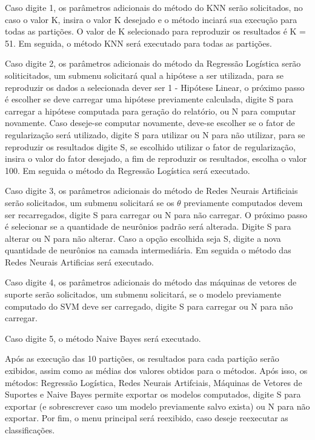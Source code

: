 Caso digite 1, os parâmetros adicionais do método do KNN serão solicitados, no caso o valor K, insira o valor K desejado e o método inciará sua execução para todas as partições. O valor de K selecionado para reproduzir os resultados é K = 51. Em seguida, o método KNN será executado para todas as partições.

Caso digite 2, os parâmetros adicionais do método da Regressão Logística serão soliticitados, um submenu solicitará qual a hipótese a ser utilizada, para se reproduzir os dados a selecionada dever ser 1 - Hipótese Linear, o próximo passo é escolher se deve carregar uma hipótese previamente calculada, digite S para carregar a hipótese computada para geração do relatório, ou N para computar novamente. Caso deseje-se computar novamente, deve-se escolher se o fator de regularização será utilizado, digite S para utilizar ou N para não utilizar, para se reproduzir os resultados digite S, se escolhido utilizar o fator de regularização, insira o valor do fator desejado, a fim de reproduzir os resultados, escolha o valor 100. Em seguida o método da Regressão Logística será executado.

Caso digite 3, os parâmetros adicionais do método de Redes Neurais Artificiais serão solicitados, um submenu solicitará se os \(\theta\) previamente computados devem ser recarregados, digite S para carregar ou N para não carregar. O próximo passo é selecionar se a quantidade de neurônios padrão será alterada. Digite S para alterar ou N para não alterar. Caso a opção escolhida seja S, digite a nova quantidade de neurônios na camada intermediária.
Em seguida o método das Redes Neurais Artificias será executado.

Caso digite 4, os parâmetros adicionais do método das máquinas de vetores de suporte serão solicitados, um submenu solicitará, se o modelo previamente computado do SVM deve ser carregado, digite S para carregar ou N para não carregar.

Caso digite 5, o método Naive Bayes será executado.

Após as execução das 10 partições, os resultados para cada partição serão exibidos, assim como as médias dos valores obtidos para o métodos. Após isso, os métodos: Regressão Logística, Redes Neurais Artifciais, Máquinas de Vetores de Suportes e Naive Bayes permite exportar os modelos computados, digite S para exportar (e sobrescrever caso um modelo previamente salvo exista) ou N para não exportar. Por fim, o menu principal será reexibido, caso deseje reexecutar as classificações.